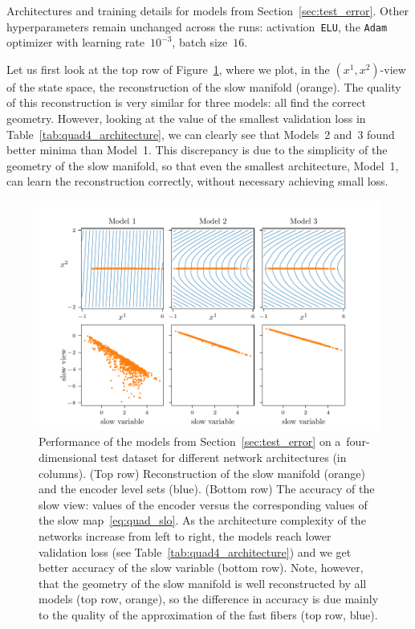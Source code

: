 \documentclass{article}
\begin{document}
\begin{table}
    \centering
    \medskip

    \caption{Architectures and training details for models from Section~\ref{sec:test_error}. Other hyperparameters remain unchanged across the runs: activation~\texttt{ELU}, the \texttt{Adam} optimizer with learning rate~$10^{-3}$, batch size~$16$.}
    \label{tab:quad4_architecture}
\end{table}

Let us first look at the top row of Figure~\ref{fig:quad4d_recon_encod_recon}, where we plot, in the $(x^1,x^2)$-view of the state space, the reconstruction of the slow manifold (orange). The quality of this reconstruction is very similar for three models: all find the correct geometry. However, looking at the value of the smallest validation loss in Table~\ref{tab:quad4_architecture}, we can clearly see that Models~2 and~3 found better minima than Model~1. This discrepancy is due to the simplicity of the geometry of the slow manifold, so that even the smallest architecture, Model~1, can learn the reconstruction correctly, without necessary achieving small loss.

\begin{figure}
    \centering
    \includegraphics[width=\textwidth]{figs/quad4d_recon_encod_recon.pdf}
    \caption{Performance of the models from Section~\ref{sec:test_error} on a~four-dimensional test dataset for different network architectures (in columns). (Top row) Reconstruction of the slow manifold (orange) and the encoder level sets (blue). (Bottom row) The accuracy of the slow view: values of the encoder versus the corresponding values of the slow map~\eqref{eq:quad_slo}. As the architecture complexity of the networks increase from left to right, the models reach lower validation loss (see Table~\ref{tab:quad4_architecture}) and we get better accuracy of the slow variable (bottom row). Note, however, that the geometry of the slow manifold is well reconstructed by all models (top row, orange), so the difference in accuracy is due mainly to the quality of the approximation of the fast fibers (top row, blue).}
    \label{fig:quad4d_recon_encod_recon}
\end{figure}
\end{document}
